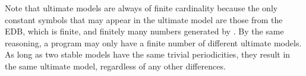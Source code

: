 Note that ultimate models are always of finite cardinality because the only constant symbols that may appear in the ultimate model are those from the EDB, which is finite, and finitely many numbers generated by .  By the same reasoning, a \lang program may only have a finite number of different ultimate models.  As long as two stable models have the same trivial periodicities, they result in the same ultimate model, regardless of any other differences.
%


%
%
%
%
%

